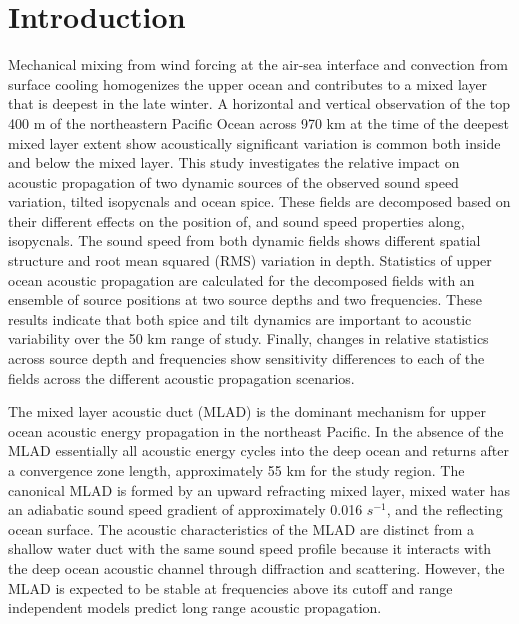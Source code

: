 \documentclass[preprint,NumberedRefs]{JASA}
\begin{document}
\section{\label{sec:intro} Introduction}
Mechanical mixing from wind forcing at the air-sea interface and convection from surface cooling homogenizes the upper ocean and contributes to a mixed layer that is deepest in the late winter.\citep{cole2010seasonal} A horizontal and vertical observation of the top 400 m of the northeastern Pacific Ocean across 970 km at the time of the deepest mixed layer extent show acoustically significant variation is common both inside and below the mixed layer.\citep{colosi2020observations} This study investigates the relative impact on acoustic propagation of two dynamic sources of the observed sound speed variation, tilted isopycnals and ocean spice. These fields are decomposed based on their different effects on the position of, and sound speed properties along, isopycnals.\cite{dzieciuch2004} The sound speed from both dynamic fields shows different spatial structure and root mean squared (RMS) variation in depth. Statistics of upper ocean acoustic propagation are calculated for the decomposed fields with an ensemble of source positions at two source depths and two frequencies. These results indicate that both spice and tilt dynamics are important to acoustic variability over the 50 km range of study. Finally, changes in relative statistics across source depth and frequencies show sensitivity differences to each of the fields across the different acoustic propagation scenarios.

The mixed layer acoustic duct (MLAD) is the dominant mechanism for upper ocean acoustic energy propagation in the northeast Pacific. In the absence of the MLAD essentially all acoustic energy cycles into the deep ocean and returns after a convergence zone length,\cite{jensen2011computational} approximately 55 km for the study region. The canonical MLAD is formed by an upward refracting mixed layer, mixed water has an adiabatic sound speed gradient of approximately 0.016 $s^{-1}$, and the reflecting ocean surface. The acoustic characteristics of the MLAD are distinct from a shallow water duct with the same sound speed profile because it interacts with the deep ocean acoustic channel through diffraction\citep{porter93} and scattering.\cite{colosi2020observations} However, the MLAD is expected to be stable at frequencies above its cutoff\citep{Urick1982Prop} and range independent models predict long range acoustic propagation.
\end{document}
